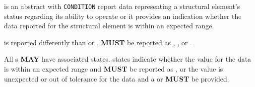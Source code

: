  is an abstract  with \texttt{CONDITION}  report data representing a \gls{structural element}’s status regarding its ability to operate or it provides an indication whether the data reported for the \gls{structural element} is within an expected range.

 is reported differently than  or .   \textbf{MUST} be reported as , , or .

All s \textbf{MAY} have associated  states.   states indicate whether the value for the data is within an expected range and \textbf{MUST} be reported as , or the value is unexpected or out of tolerance for the data and a  or  \textbf{MUST} be provided.


